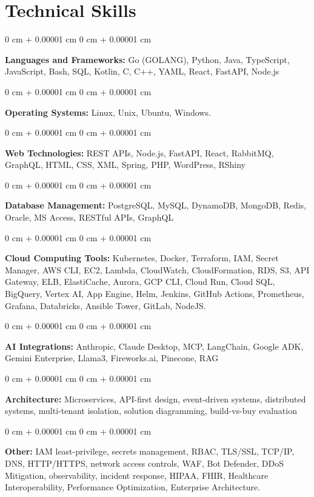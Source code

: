 \documentclass[10pt, letterpaper]{article}
\newenvironment{onecolentry}{
    \begin{adjustwidth}{
        0 cm + 0.00001 cm
    }{
        0 cm + 0.00001 cm
    }
}{
    \end{adjustwidth}
} %
\begin{document}
    \vspace{2 pt }

    \section{Technical Skills}
    \vspace{2 pt }
    \begin{onecolentry}
    \textbf{Languages and Frameworks:} Go (GOLANG), Python, Java, TypeScript, JavaScript, Bash, SQL, Kotlin, C, C++, YAML, React, FastAPI, Node.js
    \end{onecolentry}
    \begin{onecolentry}
        \textbf{Operating Systems:} Linux, Unix, Ubuntu, Windows.
    \end{onecolentry}
    \begin{onecolentry}
         \textbf{Web Technologies:} REST APIs, Node.js, FastAPI, React, RabbitMQ, GraphQL, HTML, CSS, XML, Spring, PHP, WordPress, RShiny
    \end{onecolentry}
    \begin{onecolentry}
        \textbf{Database Management:} PostgreSQL, MySQL, DynamoDB, MongoDB, Redis, Oracle, MS Access, RESTful APIs, GraphQL
    \end{onecolentry}
    \begin{onecolentry}
        \textbf{Cloud Computing Tools:}
Kubernetes, Docker, Terraform, IAM, Secret Manager, AWS CLI, EC2, Lambda, CloudWatch, CloudFormation, RDS, S3, API Gateway, ELB, ElastiCache, Aurora, GCP CLI, Cloud Run, Cloud SQL, BigQuery, Vertex AI, App Engine, Helm, Jenkins, GitHub Actions, Prometheus, Grafana, Databricks, Ansible Tower, GitLab, NodeJS.
    \end{onecolentry}
    \begin{onecolentry}
         \textbf{AI Integrations:} Anthropic, Claude Desktop, MCP, LangChain, Google ADK, Gemini Enterprise, Llama3, Fireworks.ai, Pinecone, RAG
    \end{onecolentry}
    \begin{onecolentry}
        \textbf{Architecture:} Microservices, API-first design, event-driven systems, distributed systems, multi-tenant isolation, solution diagramming, build-vs-buy evaluation
    \end{onecolentry}
        \begin{onecolentry}
     \textbf{Other:} IAM least-privilege, secrets management, RBAC, TLS/SSL, TCP/IP, DNS, HTTP/HTTPS, network access controls, WAF, Bot Defender, DDoS Mitigation, observability, incident response, HIPAA, FHIR, Healthcare Interoperability, Performance Optimization, Enterprise Architecture.
    \end{onecolentry}
\end{document}
